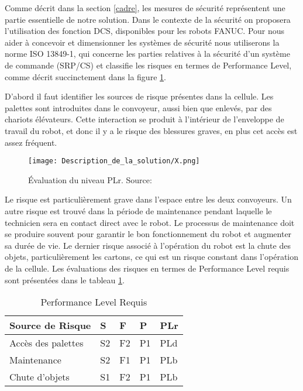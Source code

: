 \label{considerations}
Comme décrit dans la section \ref{cadre}, les mesures de sécurité représentent une partie essentielle de notre solution. Dans le contexte de la sécurité on proposera l’utilisation des fonction DCS, disponibles pour les robots FANUC. Pour nous aider à concevoir et dimensionner les systèmes de sécurité nous utiliserons la norme ISO 13849-1, qui concerne les parties relatives à la sécurité d’un système de commande (SRP/CS) et classifie les risques en termes de Performance Level, comme décrit succinctement dans la figure \ref{fig:X}.
\par
D’abord il faut identifier les sources de risque présentes dans la cellule. Les palettes sont introduites dans le convoyeur, aussi bien que enlevés, par des chariots élévateurs. Cette interaction se produit à l’intérieur de l’enveloppe de travail du robot, et donc il y a le risque des blessures graves, en plus cet accès est assez fréquent.
\newpage

\begin{figure}[H]
	\begin{center}	
		\texttt{[image: Description\_de\_la\_solution/X.png]}
		\caption{Évaluation du niveau PLr. Source: \cite{siteeller}}
		\label{fig:X}
	\end{center}
\end{figure}

 

Le risque est particulièrement grave dans l'espace entre les deux convoyeurs. Un autre risque est trouvé dans la période de maintenance pendant laquelle le technicien sera en contact direct avec le robot. Le processus de maintenance doit se produire souvent pour garantir le bon fonctionnement du robot et augmenter sa durée de vie. Le dernier risque associé à l'opération du robot est la chute des objets, particulièrement les cartons, ce qui est un risque constant dans l’opération de la cellule. Les évaluations des risques en termes de Performance Level requis sont présentées dans le tableau \ref{tab:Performance}.

\begin{table}[H]
	\caption{Performance Level Requis}
	\label{tab:Performance}
	\begin{tabularx}{\textwidth}{>{\centering\arraybackslash}X|>{\centering\arraybackslash}X|>{\centering\arraybackslash}X|>{\centering\arraybackslash}X|>{\centering\arraybackslash}X}
		\textbf{Source de Risque}&
		\textbf{S}&
		\textbf{F}&
		\textbf{P}&
		\textbf{PLr}\\
		\hline
		Accès des palettes&
		S2&
		F2&
		P1&
		PLd\\
		\hline
		Maintenance&
		S2&
		F1&
		P1&
		PLb\\
		\hline
		Chute d’objets&
		S1&
		F2&
		P1&
		PLb\\
	\end{tabularx}
\end{table}

